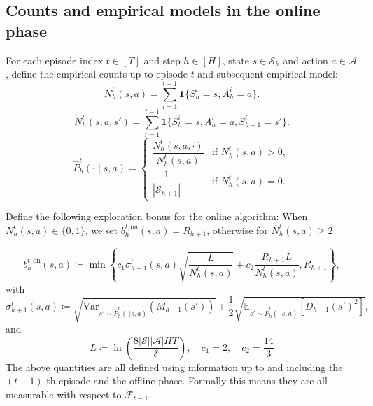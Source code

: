 \documentclass[twoside]{article}
\newcommand{\on}{\mathrm{on}} %
\newcommand{\bont}{b_h^{t,\on}} %
\begin{document}
\subsection*{Counts and empirical models in the online phase}
\label{sec:counts}
For each episode index $t\in [T]$ and step $h\in[H]$, state $s\in\mathcal{S}_h$ and action $a\in\mathcal{A}$, define the empirical counts up to episode $t$ and subsequent empirical model:
\[
N_h^t(s,a)=\sum_{i=1}^{t-1}\mathbf{1}\{S_h^i=s,A_h^i=a\}.
\]
\[
N_h^t(s,a,s')=\sum_{i=1}^{t-1}\mathbf{1}\{S_h^i=s,A_h^i=a,S_{h+1}^i=s'\}.
\]
\[
\widehat{P}_h^{t}(\cdot\mid s,a)=
\begin{cases}
\dfrac{N_h^t(s,a,\cdot)}{N_h^t(s,a)} & \text{if } N_h^t(s,a)>0,\\[1em]
\dfrac{1}{|\mathcal{S}_{h+1}|} & \text{if } N_h^t(s,a)=0.
\end{cases}
\]

 Define the following exploration bonus for the online algorithm:  When $N_h^t(s,a) \in \lbrace0,1\rbrace$, we set $\bont(s,a) = R_{h+1}$, otherwise for $N_h^t(s,a) \geq 2$

\begin{equation}\label{eq:def_bonus_online}
\bont(s,a)\coloneqq \min \left \lbrace 
c_1 \sigma_{h+1}^t(s,a) \sqrt{\frac{ L}{N_h^t(s,a)}} + 
c_2 \frac{R_{h+1} L}{N_h^t(s,a)}, R_{h+1} \right \rbrace,
\end{equation}
%
with
\[
\sigma_{h+1}^t(s,a) \coloneqq \sqrt{\mathrm{Var}_{s'\sim\widehat{P}_h^{t}(\cdot|s,a)} (M_{h+1}(s') )}
 + \dfrac12\sqrt{\mathbb{E}_{s'\sim\widehat{P}_h^{t}(\cdot|s,a)} [D_{h+1}(s')^2 ]},
\]
and 
\[
 L\coloneqq\ln\left(\dfrac{8|\mathcal{S}| |\mathcal{A}| H T}{\delta} \right),\quad c_1 =2,\quad c_2=\frac{14}{3}
\]
The above quantities are all defined using information up to and including the $(t-1)$-th episode and the offline phase. Formally this means they are all measurable with respect to $\mathcal{F}_{t-1}$.
\end{document}
